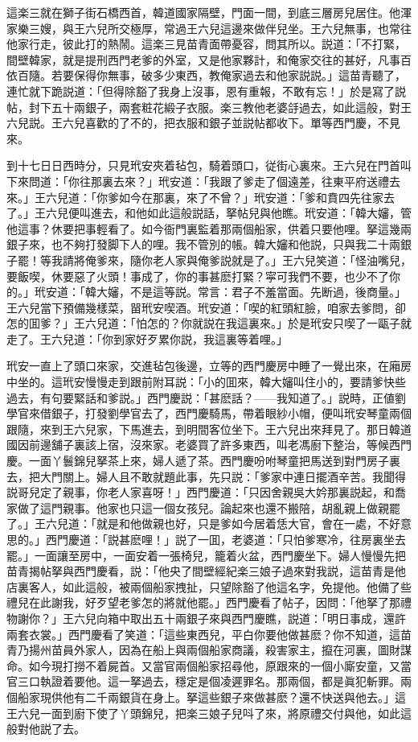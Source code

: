 這楽三就在獅子街石橋西首，韓道國家隔壁，門面一間，到底三層房兒居住。他渾家樂三嫂，與王六兒所交極厚，常過王六兒這邊來做伴兒坐。王六兒無事，也常往他家行走，彼此打的熱鬧。這楽三見苗青面帶憂容，問其所以。説道：「不打緊，間壁韓家，就是提刑西門老爹的外室，又是他家夥計，和俺家交往的甚好，凡事百依百隨。若要保得你無事，破多少東西，教俺家過去和他家説説。」這苗青聽了，連忙就下跪説道：「但得除豁了我身上沒事，恩有重報，不敢有忘！」於是寫了説帖，封下五十兩銀子，兩套粧花緞子衣服。楽三教他老婆㧱過去，如此這般，對王六兒説。王六兒喜歡的了不的，把衣服和銀子並説帖都收下。單等西門慶，不見來。

到十七日日西時分，只見玳安夾着毡包，騎着頭口，従街心裏來。王六兒在門首叫下來問道：「你往那裏去來？」玳安道：「我跟了爹走了個遠差，往東平府送禮去來。」王六兒道：「你爹如今在那裏，來了不曾？」玳安道：「爹和賁四先往家去了。」王六兒便叫進去，和他如此這般説話，拏帖兒與他瞧。玳安道：「韓大嬸，管他這事？休要把事輕看了。如今衙門裏監着那兩個船家，供着只要他哩。拏這幾兩銀子來，也不夠打發脚下人的哩。我不管別的帳。韓大嬸和他説，只與我二十兩銀子罷！等我請將俺爹來，隨你老人家與俺爹説就是了。」王六兒笑道：「怪油嘴兒，要飯喫，休要惡了火頭！事成了，你的事甚麽打緊？寜可我們不要，也少不了你的。」玳安道：「韓大嬸，不是這等説。常言：君子不羞當面。先断過，後商量。」王六兒當下預備幾樣菜，㽞玳安喫酒。玳安道：「喫的紅頭紅臉，咱家去爹問，卻怎的囬爹？」王六兒道：「怕怎的？你就説在我這裏來。」於是玳安只喫了一甌子就走了。王六兒道：「你到家好歹累你説，我這裏等着哩。」

玳安一直上了頭口來家，交進毡包後邊，立等的西門慶房中睡了一覺出來，在廂房中坐的。這玳安慢慢走到跟前附耳説：「小的囬來，韓大嬸叫住小的，要請爹快些過去，有句要緊話和爹説。」西門慶説：「甚麽話？——我知道了。」説時，正値劉學官來借銀子，打發劉學官去了，西門慶騎馬，帶着眼紗小帽，便叫玳安琴童兩個跟隨，來到王六兒家，下馬進去，到明間客位坐下。王六兒出來拜見了。那日韓道國因前邊舖子裏該上宿，沒來家。老婆買了許多東西，叫老馮廚下整治，等候西門慶。一面丫鬟錦兒拏茶上來，婦人遞了茶。西門慶吩咐琴童把馬送到對門房子裏去，把大門關上。婦人且不敢就題此事，先只説：「爹家中連日擺酒辛苦。我聞得説哥兒定了親事，你老人家喜呀！」西門慶道：「只因舍親吳大妗那裏説起，和喬家做了這門親事。他家也只這一個女孩兒。論起來也還不搬陪，胡亂親上做親罷了。」王六兒道：「就是和他做親也好，只是爹如今居着恁大官，會在一處，不好意思的。」西門慶道：「説甚麽哩！」説了一囬，老婆道：「只怕爹寒冷，往房裏坐去罷。」一面讓至房中，一面安着一張椅兒，籠着火盆，西門慶坐下。婦人慢慢先把苗青揭帖拏與西門慶看，説：「他央了間壁經紀楽三娘子過來對我説，這苗青是他店裏客人，如此這般，被兩個船家拽扯，只望除豁了他這名字，免提他。他備了些禮兒在此謝我，好歹望老爹怎的將就他罷。」西門慶看了帖子，因問：「他拏了那禮物謝你？」王六兒向箱中取出五十兩銀子來與西門慶瞧，説道：「明日事成，還許兩套衣裳。」西門慶看了笑道：「這些東西兒，平白你要他做甚麽？你不知道，這苗青乃揚州苗員外家人，因為在船上與兩個船家商議，殺害家主，攛在河裏，圖財謀命。如今現打撈不着屍首。又當官兩個船家招尋他，原跟來的一個小廝安童，又當官三口執證着要他。這一拏過去，穩定是個凌遲罪名。那兩個，都是眞犯斬罪。兩個船家現供他有二千兩銀貨在身上。拏這些銀子來做甚麽？還不快送與他去。」這王六兒一面到廚下使了丫頭錦兒，把楽三娘子兒呌了來，將原禮交付與他，如此這般對他説了去。

